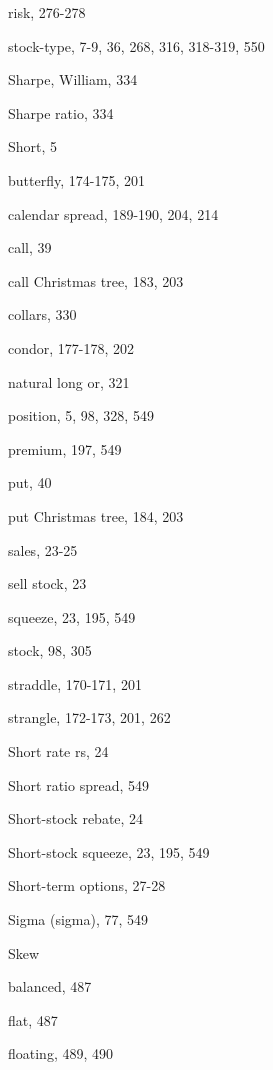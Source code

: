 \noindent risk, 276-278\par
\noindent stock-type, 7-9, 36, 268, 316, 318-319, 550\par
\noindent Sharpe, William, 334\par
\noindent Sharpe ratio, 334\par
\noindent Short, 5\par
\noindent butterfly, 174-175, 201\par
\noindent calendar spread, 189-190, 204, 214\par
\noindent call, 39\par
\noindent call Christmas tree, 183, 203\par
\noindent collars, 330\par
\noindent condor, 177-178, 202\par
\noindent natural long or, 321\par
\noindent position, 5, 98, 328, 549\par
\noindent premium, 197, 549\par
\noindent put, 40\par
\noindent put Christmas tree, 184, 203\par
\noindent sales, 23-25\par
\noindent sell stock, 23\par
\noindent squeeze, 23, 195, 549\par
\noindent stock, 98, 305\par
\noindent straddle, 170-171, 201\par
\noindent strangle, 172-173, 201, 262\par
\noindent Short rate rs, 24\par
\noindent Short ratio spread, 549\par
\noindent Short-stock rebate, 24\par
\noindent Short-stock squeeze, 23, 195, 549\par
\noindent Short-term options, 27-28\par
\noindent Sigma (sigma), 77, 549\par
\noindent Skew\par
\noindent balanced, 487\par
\noindent flat, 487\par
\noindent floating, 489, 490\par

